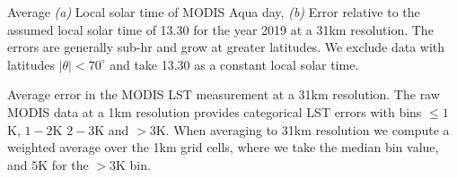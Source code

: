 \documentclass[hess, twostagejnl]{copernicus}
\providecommand{\DIFdel}[1]{{\protect\color{red} \scriptsize #1}} %
\providecommand{\DIFdelbegin}{} %
\providecommand{\DIFdelend}{} %
\providecommand{\DIFdelFL}[1]{\DIFdel{#1}} %
\begin{document}
\DIFdelbegin %
{%
\DIFdelFL{Average \textit{(a)} Local solar time of MODIS Aqua day, \textit{(b)} Error relative to the assumed local solar time of 13.30 for the year 2019 at a 31km resolution. The errors are generally sub-hr and grow at greater latitudes. We exclude data with latitudes $|\theta| < 70^{\circ}$ and take 13.30 as a constant local solar time.}} 
\DIFdelend 

\DIFdelbegin %
{%
\DIFdelFL{Average error in the MODIS LST measurement at a 31km resolution. The raw MODIS data at a 1km resolution provides categorical LST errors with bins $\leq 1$K, $1 - 2$K $2-3$K and $>3$K. When averaging to 31km resolution we compute a weighted average over the 1km grid cells, where we take the median bin value, and $5$K for the $>3$K bin.}} 
\end{document}
